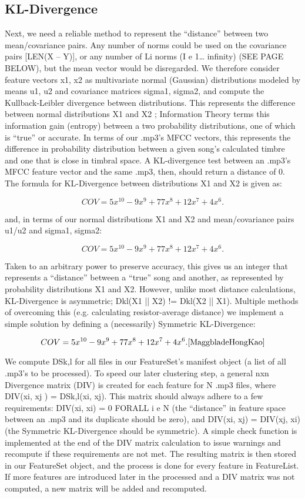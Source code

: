 \documentclass[10pt,twocolumn]{article}
\begin{document}
\subsection{KL-Divergence}

Next, we need a reliable method to represent the “distance” between two mean/covariance pairs. Any number of norms could be used on the covariance pairs [LEN(X – Y)], or any number of Li norms (I e 1… infinity) (SEE PAGE BELOW), but the mean vector would be disregarded. We therefore consider feature vectors x1, x2 as multivariate normal (Gaussian) distributions modeled by means u1, u2 and covariance matrices sigma1, sigma2, and compute the Kullback-Leibler divergence between distributions. This represents the difference between normal distributions X1 and X2 \cite{ChiRussel-web}; Information Theory terms this information gain (entropy) between a two probability distributions, one of which is “true” or accurate. In terms of our .mp3’s MFCC vectors, this represents the difference in probability distribution between a given song’s calculated timbre and one that is close in timbral space. A KL-divergence test between an .mp3’s MFCC feature vector and the same .mp3, then, should return a distance of 0. The formula for KL-Divergence between distributions X1 and X2 is given as:

$$
COV = 5x^{10}-9x^9 + 77x^8 + 12x^7 + 4x^6.
$$

and, in terms of our normal distributions X1 and X2 and mean/covariance pairs u1/u2 and sigma1, sigma2:

$$
COV = 5x^{10}-9x^9 + 77x^8 + 12x^7 + 4x^6.
$$

Taken to an arbitrary power to preserve accuracy, this gives us an integer that represents a “distance” between a “true” song and another, as represented by probability distributions X1 and X2. However, unlike most distance calculations, KL-Divergence is asymmetric; Dkl(X1 || X2) != Dkl(X2 || X1). Multiple methods of overcoming this (e.g. calculating resistor-average distance) \cite{JohnsonSinaovic} we implement a simple solution by defining a (necessarily) Symmetric KL-Divergence: 

$$
COV = 5x^{10}-9x^9 + 77x^8 + 12x^7 + 4x^6.
\cite{MaggbladeHongKao}
$$

We compute DSk,l for all files in our FeatureSet’s manifest object (a list of all .mp3’s to be processed). To speed our later clustering step, a general nxn Divergence matrix (DIV) is created for each feature for N .mp3 files, where DIV(xi, xj ) = DSk,l(xi, xj). This matrix should always adhere to a few requirements: DIV(xi, xi) = 0 FORALL i e N (the “distance” in feature space between an .mp3 and its duplicate should be zero), and DIV(xi, xj) = DIV(xj, xi) (the Symmetric KL-Divergence should be symmetric). A simple check function is implemented at the end of the DIV matrix calculation to issue warnings and recompute if these requirements are not met. The resulting matrix is then stored in our FeatureSet object, and the process is done for every feature in FeatureList. If more features are introduced later in the processed and a DIV matrix was not computed, a new matrix will be added and recomputed. 
\end{document}
